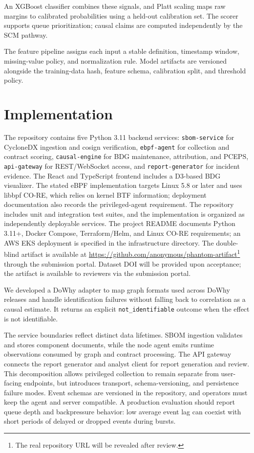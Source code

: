\documentclass[conference]{IEEEtran}
\begin{document}
An XGBoost classifier combines these signals, and Platt scaling maps raw margins to calibrated probabilities using a held-out calibration set. The scorer supports queue prioritization; causal claims are computed independently by the SCM pathway.

The feature pipeline assigns each input a stable definition, timestamp window, missing-value policy, and normalization rule. Model artifacts are versioned alongside the training-data hash, feature schema, calibration split, and threshold policy.

\section{Implementation}
The repository contains five Python 3.11 backend services: \texttt{sbom-service} for CycloneDX ingestion and cosign verification, \texttt{ebpf-agent} for collection and contract scoring, \texttt{causal-engine} for BDG maintenance, attribution, and PCEPS, \texttt{api-gateway} for REST/WebSocket access, and \texttt{report-generator} for incident evidence. The React and TypeScript frontend includes a D3-based BDG visualizer. The stated eBPF implementation targets Linux 5.8 or later and uses libbpf CO-RE, which relies on kernel BTF information; deployment documentation also records the privileged-agent requirement. The repository includes unit and integration test suites, and the implementation is organized as independently deployable services. The project README documents Python 3.11+, Docker Compose, Terraform/Helm, and Linux CO-RE requirements; an AWS EKS deployment is specified in the infrastructure directory. The double-blind artifact is available at \url{https://github.com/anonymous/phantom-artifact}\footnote{The real repository URL will be revealed after review.} through the submission portal. Dataset DOI will be provided upon acceptance; the artifact is available to reviewers via the submission portal.

We developed a DoWhy adapter to map graph formats used across DoWhy releases and handle identification failures without falling back to correlation as a causal estimate. It returns an explicit \texttt{not\_identifiable} outcome when the effect is not identifiable.

The service boundaries reflect distinct data lifetimes. SBOM ingestion validates and stores component documents, while the node agent emits runtime observations consumed by graph and contract processing. The API gateway connects the report generator and analyst client for report generation and review. This decomposition allows privileged collection to remain separate from user-facing endpoints, but introduces transport, schema-versioning, and persistence failure modes. Event schemas are versioned in the repository, and operators must keep the agent and server compatible. A production evaluation should report queue depth and backpressure behavior: low average event lag can coexist with short periods of delayed or dropped events during bursts.
\end{document}
